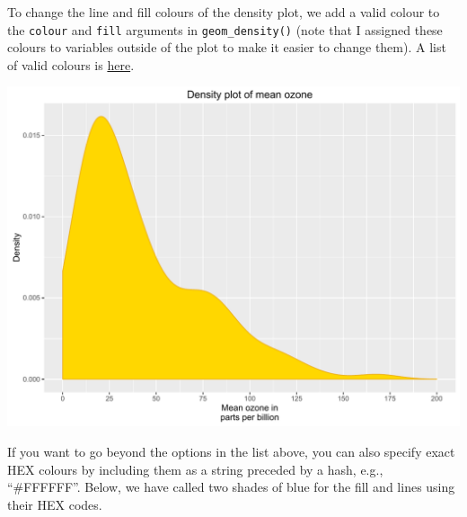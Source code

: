 To change the line and fill colours of the density plot, we add a valid
colour to the \texttt{colour} and \texttt{fill} arguments in
\texttt{geom\_density()} (note that I assigned these colours to
variables outside of the plot to make it easier to change them). A list
of valid colours is
\href{http://www.stat.columbia.edu/~tzheng/files/Rcolor.pdf}{here}.

\begin{Shaded}
\begin{Highlighting}[]

\StringTok{ }\NormalTok{(} \StringTok{ }
\StringTok{      }\NormalTok{(}  
\StringTok{      }\NormalTok{(} \NormalTok{,}
\StringTok{        } \NormalTok{(}\NormalTok{, }\NormalTok{, }\NormalTok{),}
\StringTok{        }\NormalTok{(}\NormalTok{, }\NormalTok{)) +}
\StringTok{      }\NormalTok{(} \NormalTok{) +}
\StringTok{      }\NormalTok{(}\NormalTok{)}
\end{Highlighting}
\end{Shaded}

\begin{center}\includegraphics[width=0.55\linewidth]{figures/density_6-1} \end{center}

If you want to go beyond the options in the list above, you can also
specify exact HEX colours by including them as a string preceded by a
hash, e.g., ``\#FFFFFF''. Below, we have called two shades of blue for
the fill and lines using their HEX codes.

